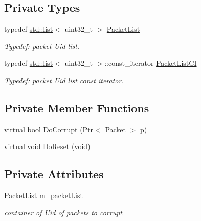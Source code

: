\subsection*{Private Types}
\begin{DoxyCompactItemize}
\item 
typedef \hyperlink{openflow-interface_8h_afd9bcfa176617760671b67580f536fa7}{std\+::list}$<$ uint32\+\_\+t $>$ \hyperlink{classns3_1_1ListErrorModel_adbaa9f470c317e60540f521b7b40b309}{Packet\+List}
\begin{DoxyCompactList}\small\item\em Typedef\+: packet Uid list. \end{DoxyCompactList}\item 
typedef \hyperlink{openflow-interface_8h_afd9bcfa176617760671b67580f536fa7}{std\+::list}$<$ uint32\+\_\+t $>$\+::const\+\_\+iterator \hyperlink{classns3_1_1ListErrorModel_aba4c1be8fd91c22eddb20ac122b8f8c4}{Packet\+List\+CI}
\begin{DoxyCompactList}\small\item\em Typedef\+: packet Uid list const iterator. \end{DoxyCompactList}\end{DoxyCompactItemize}
\subsection*{Private Member Functions}
\begin{DoxyCompactItemize}
\item 
virtual bool \hyperlink{classns3_1_1ListErrorModel_a2324425a02ceefea04cd88167b4f9e9c}{Do\+Corrupt} (\hyperlink{classns3_1_1Ptr}{Ptr}$<$ \hyperlink{classns3_1_1Packet}{Packet} $>$ \hyperlink{lte__link__budget__x2__handover__measures_8m_ac9de518908a968428863f829398a4e62}{p})
\item 
virtual void \hyperlink{classns3_1_1ListErrorModel_a6a24f9a3756ebf15f2425af0eb91a69b}{Do\+Reset} (void)
\end{DoxyCompactItemize}
\subsection*{Private Attributes}
\begin{DoxyCompactItemize}
\item 
\hyperlink{classns3_1_1ListErrorModel_adbaa9f470c317e60540f521b7b40b309}{Packet\+List} \hyperlink{classns3_1_1ListErrorModel_aa2e31c5887a6a1fe296dbacb6a4c3142}{m\+\_\+packet\+List}
\begin{DoxyCompactList}\small\item\em container of Uid of packets to corrupt \end{DoxyCompactList}\end{DoxyCompactItemize}
